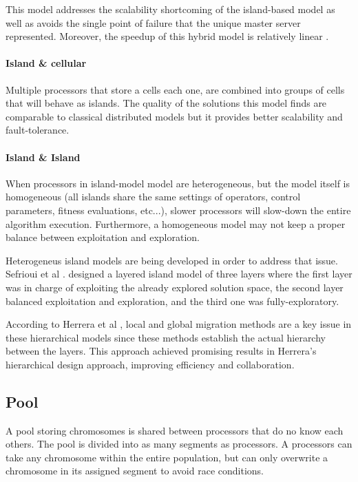 This model addresses the scalability shortcoming of the island-based model as well as avoids the single point of failure that the unique master server represented. Moreover, the speedup of this hybrid model is relatively linear \cite{13}.

\paragraph*{Island \& cellular} Multiple processors that store a cells each one, are combined into groups of cells that will behave as islands. The quality of the solutions this model finds are comparable to classical distributed models but it provides better scalability and fault-tolerance.

\paragraph*{Island \& Island} When processors in island-model model are heterogeneous, but the model itself is homogeneous (all islands share the same settings of operators, control parameters, fitness evaluations, etc...), slower processors will slow-down the entire algorithm execution. Furthermore, a homogeneous model may not keep a proper balance between exploitation and exploration.  

Heterogeneus island models are being developed in order to address that issue. Sefrioui et al \cite{112}. designed a layered island model of three layers where the first layer was in charge of exploiting the already explored solution space, the second layer balanced exploitation and exploration, and the third one was fully-exploratory.

According to Herrera et al \cite{57}, local and global migration methods are a key issue in these hierarchical models since these methods establish the actual hierarchy between the layers. This approach achieved promising results in Herrera's hierarchical design approach, improving efficiency and collaboration. 

\subsection{Pool}
A pool storing chromosomes is shared between processors that do no know each others. The pool is divided into as many segments as processors. A processors can take any chromosome within the entire population, but can only overwrite a chromosome in its assigned segment to avoid race conditions.

